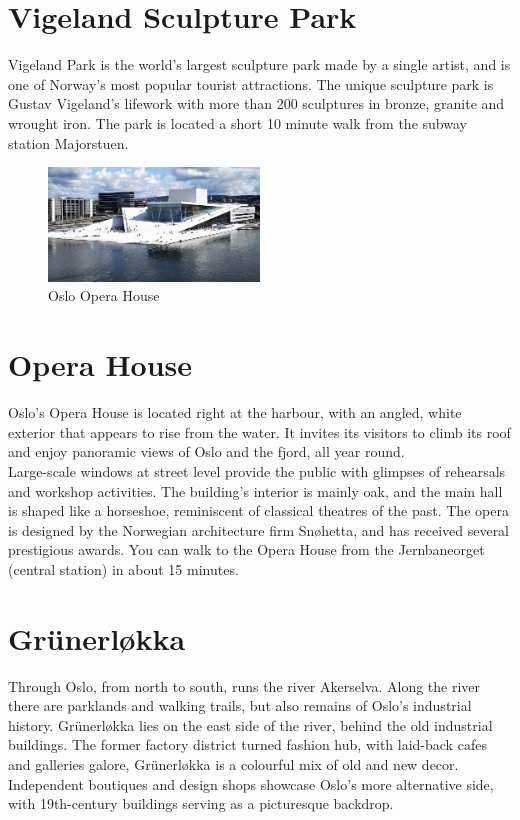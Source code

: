 \documentclass{article}
\begin{document}
\section*{Vigeland Sculpture Park}

Vigeland Park is the world's largest sculpture park made by a single artist, and is one of Norway's most popular tourist attractions. The unique sculpture park is Gustav Vigeland's lifework with more than 200 sculptures in bronze, granite and wrought iron. The park is located a short 10 minute walk from the subway station Majorstuen.

\begin{figure}
    \centering
    \includegraphics[width=0.5\textwidth]{img/operahouse.jpg}%
     \caption*{Oslo Opera House }
\end{figure}

\vspace{1cm}

\section*{Opera House}
Oslo's Opera House is located right at the harbour, with an angled, white exterior that appears to rise from the water. It invites its visitors to climb its roof and enjoy panoramic views of Oslo and the fjord, all year round. \\
Large-scale windows at street level provide the public with glimpses of rehearsals and workshop activities. The building's interior is mainly oak, and the main hall is shaped like a horseshoe, reminiscent of classical theatres of the past. The opera is designed by the Norwegian architecture firm Snøhetta, and has received several prestigious awards. You can walk to the Opera House from the Jernbaneorget (central station) in about 15 minutes.

\clearpage

\section*{Gr\"unerløkka}
Through Oslo, from north to south, runs the river Akerselva. Along the river there are parklands and walking trails, but also remains of Oslo’s industrial history.
Gr\"unerløkka lies on the east side of the river, behind the old industrial buildings. The former factory district turned fashion hub, with laid-back cafes and galleries galore, Gr\"unerløkka is a colourful mix of old and new decor. Independent boutiques and design shops showcase Oslo’s more alternative side, with 19th-century buildings serving as a picturesque backdrop.
\end{document}

